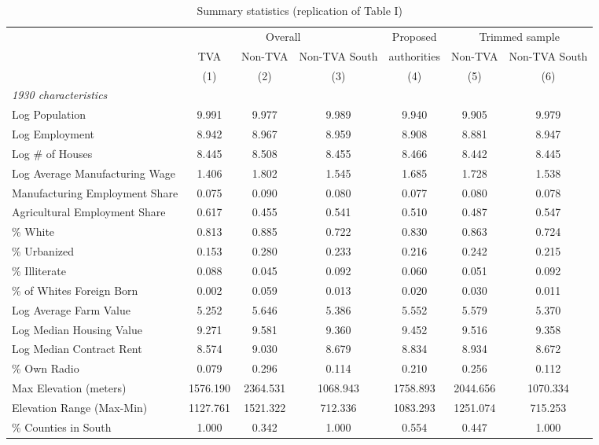 \begin{table}[htbp]
\centering
\scriptsize
\setlength{\tabcolsep}{4pt}
\caption{Summary statistics (replication of Table I)}
\label{tab:km_t1}
\begin{tabular}{lcccccc}
\toprule
 & \multicolumn{3}{c}{Overall} & Proposed & \multicolumn{2}{c}{Trimmed sample} \\
\cmidrule(lr){2-4}\cmidrule(lr){6-7}
 & TVA & Non-TVA & Non-TVA South & authorities & Non-TVA & Non-TVA South \\
 & (1) & (2) & (3) & (4) & (5) & (6) \\
\midrule
\multicolumn{7}{l}{\textit{1930 characteristics}} \\
Log Population & 9.991 & 9.977 & 9.989 & 9.940 & 9.905 & 9.979 \\
Log Employment & 8.942 & 8.967 & 8.959 & 8.908 & 8.881 & 8.947 \\
Log \# of Houses & 8.445 & 8.508 & 8.455 & 8.466 & 8.442 & 8.445 \\
Log Average Manufacturing Wage & 1.406 & 1.802 & 1.545 & 1.685 & 1.728 & 1.538 \\
Manufacturing Employment Share & 0.075 & 0.090 & 0.080 & 0.077 & 0.080 & 0.078 \\
Agricultural Employment Share & 0.617 & 0.455 & 0.541 & 0.510 & 0.487 & 0.547 \\
\% White & 0.813 & 0.885 & 0.722 & 0.830 & 0.863 & 0.724 \\
\% Urbanized & 0.153 & 0.280 & 0.233 & 0.216 & 0.242 & 0.215 \\
\% Illiterate & 0.088 & 0.045 & 0.092 & 0.060 & 0.051 & 0.092 \\
\% of Whites Foreign Born & 0.002 & 0.059 & 0.013 & 0.020 & 0.030 & 0.011 \\
Log Average Farm Value & 5.252 & 5.646 & 5.386 & 5.552 & 5.579 & 5.370 \\
Log Median Housing Value & 9.271 & 9.581 & 9.360 & 9.452 & 9.516 & 9.358 \\
Log Median Contract Rent & 8.574 & 9.030 & 8.679 & 8.834 & 8.934 & 8.672 \\
\% Own Radio & 0.079 & 0.296 & 0.114 & 0.210 & 0.256 & 0.112 \\
Max Elevation (meters) & 1576.190 & 2364.531 & 1068.943 & 1758.893 & 2044.656 & 1070.334 \\
Elevation Range (Max-Min) & 1127.761 & 1521.322 & 712.336 & 1083.293 & 1251.074 & 715.253 \\
\% Counties in South & 1.000 & 0.342 & 1.000 & 0.554 & 0.447 & 1.000 \\

\end{tabular}
\end{table}
